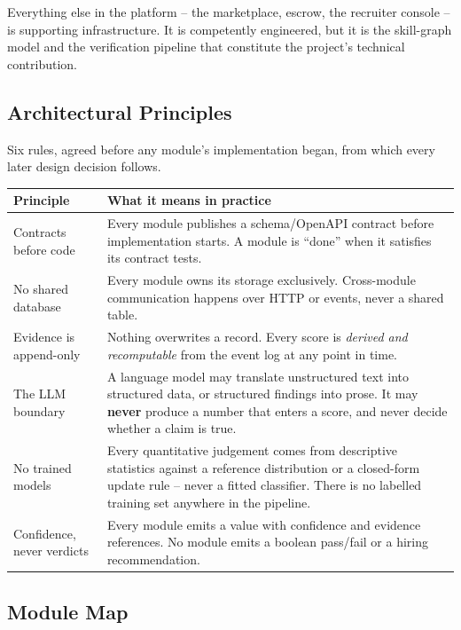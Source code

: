 \documentclass[11pt,a4paper]{article}
\begin{document}
Everything else in the platform -- the marketplace, escrow, the recruiter
console -- is supporting infrastructure. It is competently engineered, but it
is the skill-graph model and the verification pipeline that constitute the
project's technical contribution.

\subsection{Architectural Principles}

Six rules, agreed before any module's implementation began, from which every
later design decision follows.

\begin{center}\small
\begin{tabular}{@{}L{3.1cm}L{10.6cm}@{}}
\toprule
\textbf{Principle} & \textbf{What it means in practice} \\
\midrule
Contracts before code & Every module publishes a schema/OpenAPI contract before implementation starts. A module is ``done'' when it satisfies its contract tests. \\
No shared database & Every module owns its storage exclusively. Cross-module communication happens over HTTP or events, never a shared table. \\
Evidence is append-only & Nothing overwrites a record. Every score is \emph{derived and recomputable} from the event log at any point in time. \\
The LLM boundary & A language model may translate unstructured text into structured data, or structured findings into prose. It may \textbf{never} produce a number that enters a score, and never decide whether a claim is true. \\
No trained models & Every quantitative judgement comes from descriptive statistics against a reference distribution or a closed-form update rule -- never a fitted classifier. There is no labelled training set anywhere in the pipeline. \\
Confidence, never verdicts & Every module emits a value with confidence and evidence references. No module emits a boolean pass/fail or a hiring recommendation. \\
\bottomrule
\end{tabular}
\end{center}

\subsection{Module Map}
\end{document}

